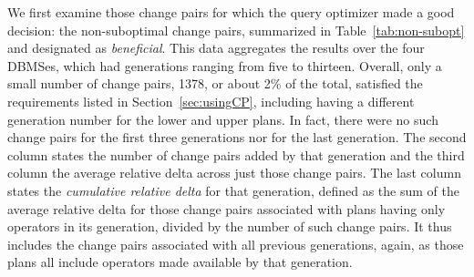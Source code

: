 \documentclass[prodmode,acmtods]{acmsmall}
\begin{document}
\begin{table}[t]
\end{table}

We first examine those change pairs for which the query optimizer made a
good \hbox{decision}: the non-suboptimal change pairs, summarized in
Table~\ref{tab:non-subopt} and designated as {\em beneficial}.
This data aggregates the results over the
four \hbox{DBMSes}, which had generations ranging from five to thirteen. Overall, only a small number of change pairs, 1378, or about 2\% of the
total, satisfied the requirements listed in Section~\ref{sec:usingCP}, including having a different
generation number for the lower and upper plans. In fact, there were no such
change pairs for the first three generations nor for the last
generation. The second column states the number of change pairs added by
that generation and the third column the average relative delta across just those change
pairs. The last column states the {\em cumulative relative delta} for that
generation, defined as
the sum of the average relative delta for those change pairs associated
with plans having only operators in its generation, divided by the number of such
change pairs. It thus
includes the change pairs associated with all previous generations,
again, as those plans all include operators made available by that generation.
\end{document}
